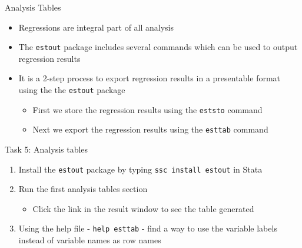 \documentclass[aspectratio=169]{beamer}
\begin{document}
\begin{frame}{Analysis Tables}
	\begin{itemize}
		\item Regressions are integral part of all analysis
		\item The \texttt{estout} package includes several commands which can be used to output regression results
		\item It is a 2-step process to export regression results in a presentable format using the the \texttt{estout} package
		\begin{itemize}
			\item First we store the regression results using the \texttt{eststo} command
			\item Next we export the regression results  using the \texttt{esttab} command
		\end{itemize}
	\end{itemize}
\end{frame}


\begin{frame}{Task 5: Analysis tables}
	\begin{enumerate}
		\item Install the \texttt{estout} package by typing \texttt{ssc install estout} in Stata
		\item Run the first analysis tables section
		\begin{itemize}
			\item Click the link in the result window to see the table generated
		\end{itemize}
		\item Using the help file - \texttt{help esttab} - find a way to use the variable labels instead of variable names as row names
	\end{enumerate}
\end{frame}
\end{document}
